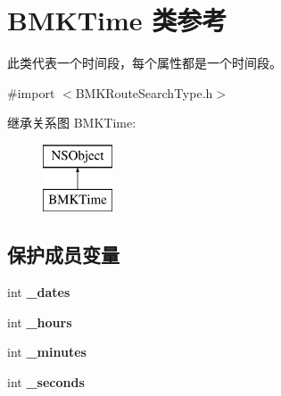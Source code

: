 \hypertarget{interface_b_m_k_time}{\section{B\-M\-K\-Time 类参考}
\label{interface_b_m_k_time}
}


此类代表一个时间段，每个属性都是一个时间段。  




{\ttfamily \#import $<$B\-M\-K\-Route\-Search\-Type.\-h$>$}

继承关系图 B\-M\-K\-Time\-:\begin{figure}[H]
\begin{center}
\leavevmode
\includegraphics[height=2.000000cm]{interface_b_m_k_time}
\end{center}
\end{figure}
\subsection*{保护成员变量}
\begin{DoxyCompactItemize}
\item 
\hypertarget{interface_b_m_k_time_af301a1d5456265dd7e7de6e436b60e6f}{int {\bfseries \-\_\-dates}}\label{interface_b_m_k_time_af301a1d5456265dd7e7de6e436b60e6f}

\item 
\hypertarget{interface_b_m_k_time_a94fe70a1661e0d87a62aea5e8410b795}{int {\bfseries \-\_\-hours}}\label{interface_b_m_k_time_a94fe70a1661e0d87a62aea5e8410b795}

\item 
\hypertarget{interface_b_m_k_time_a9e7741ab7eed73e512d8c774e010dfc4}{int {\bfseries \-\_\-minutes}}\label{interface_b_m_k_time_a9e7741ab7eed73e512d8c774e010dfc4}

\item 
\hypertarget{interface_b_m_k_time_a398774b4d57bf197fff42a0503d607c7}{int {\bfseries \-\_\-seconds}}\label{interface_b_m_k_time_a398774b4d57bf197fff42a0503d607c7}

\end{DoxyCompactItemize}
